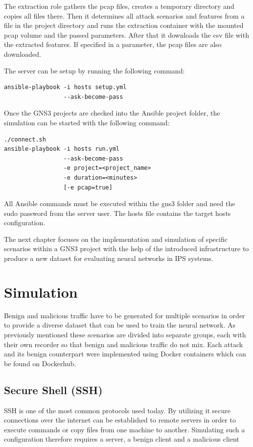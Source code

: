 \documentclass[conference]{IEEEtran}
\begin{document}
The extraction role gathers the pcap files, creates a temporary directory and copies all files there. Then it determines all attack scenarios and features from a file in the project directory and runs the extraction container with the mounted pcap volume and the passed parameters. After that it downloads the csv file with the extracted features. If specified in a parameter, the pcap files are also downloaded.

The server can be setup by running the following command:
\begin{verbatim}
ansible-playbook -i hosts setup.yml 
                 --ask-become-pass
\end{verbatim}

Once the GNS3 projects are checked into the Ansible project folder, the simulation can be started with the following command:
\begin{verbatim}
./connect.sh
ansible-playbook -i hosts run.yml
                 --ask-become-pass
                 -e project=<project_name>
                 -e duration=<minutes>
                 [-e pcap=true]
\end{verbatim}

All Ansible commands must be executed within the gns3 folder and need the sudo password from the server user. The hosts file contains the target hosts configuration.

The next chapter focuses on the implementation and simulation of specific scenarios within a GNS3 project with the help of the introduced infrastructure to produce a new dataset for evaluating neural networks in IPS systems.  

\section{Simulation}
Benign and malicious traffic have to be generated for multiple scenarios in order to provide a diverse dataset that can be used to train the neural network. As previously mentioned these scenarios are divided into separate groups, each with their own recorder so that benign and malicious traffic do not mix. Each attack and its benign counterpart were implemented using Docker containers which can be found on Dockerhub.

\subsection{Secure Shell (SSH)}
SSH is one of the most common protocols used today. By utilizing it secure connections over the internet can be established to remote servers in order to execute commands or copy files from one machine to another. Simulating such a configuration therefore requires a server, a benign client and a malicious client
\end{document}
